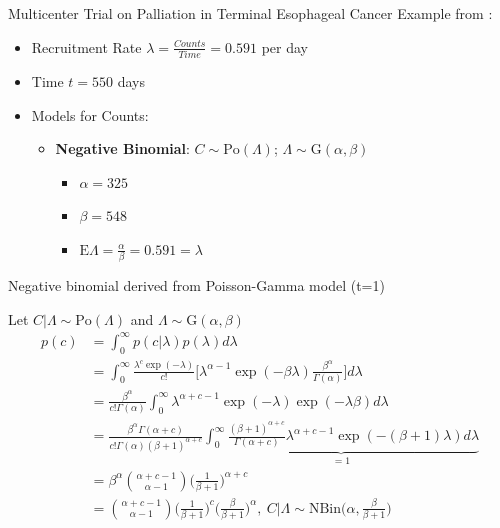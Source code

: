 \documentclass[english]{beamer}\usepackage[]{graphicx}\usepackage[]{xcolor}
\begin{document}
\begin{frame}{Multicenter Trial on Palliation in Terminal Esophageal Cancer}
Example from \cite{carter2004application}:
\begin{itemize}
\item Recruitment Rate $\lambda = \frac{Counts}{Time} = 0.591$ per day
\item Time $t = 550$ days
\item Models for Counts:
	\begin{itemize}
	\item \textbf{Negative Binomial}: $C \sim \textrm{Po} (\Lambda)$; $\Lambda \sim \textrm{G}(\alpha,\beta)$
		\begin{itemize}
		\item $\alpha = 325$
		\item $\beta = 548$
		\item $\textrm{E} \Lambda = \frac{\alpha}{\beta} = 0.591 = \lambda$
		\end{itemize}
	\end{itemize}
\end{itemize}
\end{frame}

\begin{frame}[shrink = 5]{Negative binomial derived from Poisson-Gamma model (t=1)}

Let $C|\Lambda \sim \textrm{Po}(\Lambda)$ and $\Lambda \sim \textrm{G}(\alpha,\beta)$
\begin{align*}
p(c)&=\int^\infty_0 p(c|\lambda) p(\lambda) d\lambda\\
&=\int^\infty_0 \frac{\lambda^c\exp(-\lambda)}{c!}\Bigg[\lambda^{\alpha-1}\exp(-\beta\lambda)\frac{\beta^\alpha}{\Gamma(\alpha)}\Bigg]d\lambda\\
&=\frac{\beta^\alpha}{c!\Gamma(\alpha)}\int^\infty_0 \lambda^{\alpha+c-1}\exp(-\lambda)\exp(-\lambda\beta)d\lambda\\
&=\frac{\beta^\alpha\Gamma(\alpha+c)}{c!\Gamma(\alpha) (\beta+1)^{\alpha+c}}\underbrace{\int^\infty_0 \frac{(\beta+1)^{\alpha+c}}{\Gamma(\alpha+c)} \lambda^{\alpha+c-1}\exp(-(\beta+1)\lambda)d\lambda}_{=1}\\
&=\beta^\alpha\binom{\alpha+c-1}{\alpha-1}\Bigg (\frac{1}{\beta+1}\Bigg)^{\alpha+c}\\
&=\binom{\alpha+c-1}{\alpha-1}\Bigg (\frac{1}{\beta+1}\Bigg)^{c} \Bigg(\frac{\beta}{\beta+1}\Bigg)^{\alpha}, \ C|\Lambda\sim \textrm{NBin} \Bigg(\alpha, \frac{\beta}{\beta+1}\Bigg)
\end{align*}
\end{frame}
\end{document}
